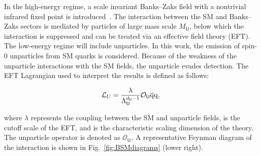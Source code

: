 In the high-energy regime, a scale invariant Banks--Zaks field with a nontrivial infrared fixed point is introduced~\cite{Banks:1981nn}.
The interaction between the SM and Banks--Zaks sectors is mediated by particles of large mass scale $M_{\textsf{U}}$, below which the interaction is suppressed and can be treated
via an effective field theory (EFT). The low-energy regime will include unparticles.
In this work, the emission of spin-0 unparticles from SM quarks is considered.
Because of the weakness of the unparticle interactions with the SM fields, the unparticle evades detection.
The EFT Lagrangian used to interpret the results is defined as follows:

\begin{equation*}
\mathcal{L}_{U}  = \frac{\lambda}{\Lambda_{\textsf{U}}^{d_{\textsf{U}}-1}} \mathcal{O}_{\textsf{U}} \overline{\mathrm{q}}\mathrm{q},
\end{equation*}

\noindent where $\lambda$ represents the coupling between the SM and unparticle fields, \LU is the cutoff scale of the EFT, and \dU is the characteristic scaling dimension of the theory.
The unparticle operator is denoted as $\mathcal{O}_{\textsf{U}}$.
A representative Feynman diagram of the interaction is shown in Fig.~\ref{fig:BSMdiagrams} (lower right).


